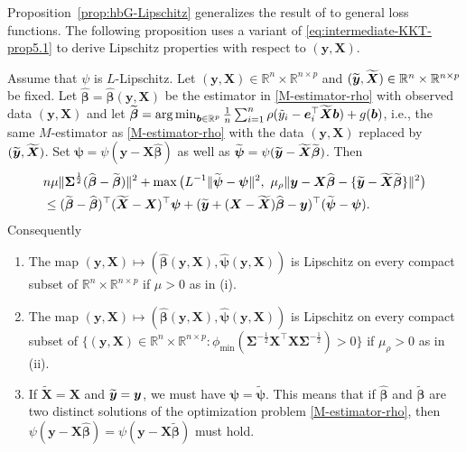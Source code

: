 \documentclass[11pt]{amsart}
\numberwithin{equation}{section}
\numberwithin{equation}{section}
\def\argmin{\mathop{\rm arg\, min}}
\def\argmin{\mathop{\rm arg\, min}}
\def\real{{\mathbb{R}}}
\def\R{{\real}}
\def\mathbold{\boldsymbol} %
\def\bb{\mathbold{b}}\def\bhat{\widehat{b}}\def\btil{\widetilde{b}}
\def\be{\mathbold{e}}
\def\bX{\mathbold{X}}\def\hbX{{\widehat{\bX}}}\def\tbX{{\widetilde{\bX}}}\def\bXbar{{\overline \bX}}
\def\by{\mathbold{y}}\def\yhat{\widehat{y}}\def\ytil{\widetilde{y}}\def\ybar{{\overline y}}\def\vby{{\bf y}}
\def\bbeta{\mathbold{\beta}}\def\betahat{\widehat{\beta}}\def\hbeta{\widehat{\beta}}
\def\hbbeta{{{\widehat{\bbeta}}}}
\def\tbbeta{\widetilde{\bbeta}}
\def\bSigma{\mathbold{\Sigma}}\def\hbSigma{{\widehat{\bSigma}}}
\def\bpsi{\mathbold{\psi}}\def\psihat{\widehat{\psi}}\def\hpsi{\widehat{\psi}}
\def\hbpsi{{\widehat{\bpsi}}}\def\tbpsi{{\widetilde{\bpsi}}}
\def\argmin{\mathop{\rm arg\, min}}
\begin{document}
Proposition~\ref{prop:hbG-Lipschitz} generalizes the result of \cite{bellec2016bounds}
to general loss functions.
The following proposition uses a variant of \eqref{eq:intermediate-KKT-prop5.1}
to derive Lipschitz properties with respect to $(\by,\bX)$.


\begin{proposition}
    \label{prop:constant-bv-e_j}
    Assume that $\psi$ is $L$-Lipschitz. Let $(\by,\bX)\in\R^n \times \R^{n\times p}$ and $(\tby,\tbX)\in\R^n \times \R^{n\times p}$ be fixed. 
    Let $\hbbeta=\hbbeta(\by,\bX)$ be the estimator
    in \eqref{M-estimator-rho} with observed data $(\by,\bX)$
    and let
    $
    \tbbeta
    =\argmin_{\bb\in\R^p}
    \frac 1 n 
    \sum_{i=1}^n
    \rho(\tilde y_i - \be_i^\top\tbX\bb)
    + g(\bb)
    $,
i.e., the same $M$-estimator as \eqref{M-estimator-rho}
with the data $(\by,\bX)$ replaced by $(\tby,\tbX)$.
Set $\bpsi = \psi(\by-\bX\hbbeta)$ as well as
$\tbpsi = \psi(\tby - \tbX\tbbeta)$.
Then
\begin{equation}
    \label{lipschitz-fundamental-inequality}
    \begin{split}
    & n \mu \|\bSigma^{\frac12}(\hbbeta-\tbbeta)\|^2 +  \max\big(
    L^{-1} \|\tbpsi - \bpsi\|^2,
    ~
    \mu_\rho \|\by-\bX\hbbeta - \{\tby-\tbX\tbbeta\}\|^2
    \big)
    \\&\le
    (\tbbeta -\hbbeta)^\top(\tbX-\bX)^\top\bpsi
    +
    (\tby + (\bX-\tbX)\hbbeta -\by)^\top(\tbpsi - \bpsi).
    \end{split}
\end{equation}
Consequently  
\begin{enumerate}
    \item 
The map $(\by,\bX)\mapsto (\hbbeta(\by,\bX),\hbpsi(\by,\bX))$
is Lipschitz on every compact subset of $\R^n\times \R^{n\times p}$ if $\mu>0$
as in (i).
\item
The map $(\by,\bX)\mapsto (\hbbeta(\by,\bX),\hbpsi(\by,\bX))$
is Lipschitz on every compact subset of
$\{(\by,\bX)\in\R^n\times \R^{n\times p}: \phi_{\min}(\bSigma^{-\frac12}\bX^\top\bX\bSigma^{-\frac12})>0 \}$
if $\mu_\rho>0$ as in (ii).
    \item
        If $\tbX=\bX$ and $\tby=\by$, we must have $\bpsi=\tbpsi$.
        This means that if $\hbbeta$ and $\tbbeta$ are two distinct
        solutions of the optimization problem \eqref{M-estimator-rho},
        then $\psi(\by-\bX\hbbeta)=\psi(\by-\bX\tbbeta)$ must hold.
\end{enumerate}
\end{proposition}
\end{document}
